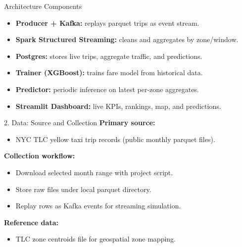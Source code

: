 \documentclass[aspectratio=169]{beamer}
\begin{document}
\begin{frame}{Architecture Components}
\begin{itemize}
  \item \textbf{Producer + Kafka:} replays parquet trips as event stream.
  \item \textbf{Spark Structured Streaming:} cleans and aggregates by zone/window.
  \item \textbf{Postgres:} stores live trips, aggregate traffic, and predictions.
  \item \textbf{Trainer (XGBoost):} trains fare model from historical data.
  \item \textbf{Predictor:} periodic inference on latest per-zone aggregates.
  \item \textbf{Streamlit Dashboard:} live KPIs, rankings, map, and predictions.
\end{itemize}
\end{frame}

\begin{frame}{2. Data: Source and Collection}
\textbf{Primary source:}
\begin{itemize}
  \item NYC TLC yellow taxi trip records (public monthly parquet files).
\end{itemize}

\textbf{Collection workflow:}
\begin{itemize}
  \item Download selected month range with project script.
  \item Store raw files under local parquet directory.
  \item Replay rows as Kafka events for streaming simulation.
\end{itemize}

\textbf{Reference data:}
\begin{itemize}
  \item TLC zone centroids file for geospatial zone mapping.
\end{itemize}
\end{frame}
\end{document}
